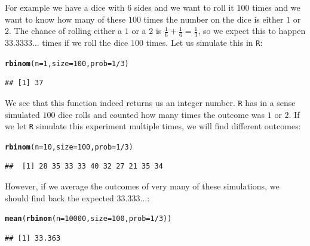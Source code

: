 \documentclass{article}\usepackage[]{graphicx}\usepackage[]{color}
\makeatletter
\newcommand{\hlnum}[1]{\textcolor[rgb]{0.686,0.059,0.569}{#1}}%
\newcommand{\hlopt}[1]{\textcolor[rgb]{0,0,0}{#1}}%
\newcommand{\hlstd}[1]{\textcolor[rgb]{0.345,0.345,0.345}{#1}}%
\newcommand{\hlkwc}[1]{\textcolor[rgb]{0.333,0.667,0.333}{#1}}%
\newcommand{\hlkwd}[1]{\textcolor[rgb]{0.737,0.353,0.396}{\textbf{#1}}}%
\newenvironment{kframe}{%
 \def\at@end@of@kframe{}%
 \ifinner\ifhmode%
  \def\at@end@of@kframe{\end{minipage}}%
  \begin{minipage}{\columnwidth}%
 \fi\fi%
 \def\FrameCommand##1{\hskip\@totalleftmargin \hskip-\fboxsep
 \colorbox{shadecolor}{##1}\hskip-\fboxsep
     \hskip-\linewidth \hskip-\@totalleftmargin \hskip\columnwidth}%
 \MakeFramed {\advance\hsize-\width
   \@totalleftmargin\z@ \linewidth\hsize
   \@setminipage}}%
 {\par\unskip\endMakeFramed%
 \at@end@of@kframe}
\newenvironment{knitrout}{}{} %
\makeatother
\begin{document}
For example we have a dice with 6 sides and we want to roll it $100$ times and we want to know how many of these $100$ times the number on the dice is either $1$ or $2$. The chance of rolling either a $1$ or a $2$ is $\frac{1}{6}+\frac{1}{6}=\frac{1}{3}$, so we expect this to happen $33.3333\dots$ times if we roll the dice $100$ times. Let us simulate this in \texttt{R}:
\begin{knitrout}
\color{fgcolor}\begin{kframe}
\begin{alltt}
\hlkwd{rbinom}\hlstd{(}\hlkwc{n}\hlstd{=}\hlnum{1}\hlstd{,}\hlkwc{size}\hlstd{=}\hlnum{100}\hlstd{,}\hlkwc{prob}\hlstd{=}\hlnum{1}\hlopt{/}\hlnum{3}\hlstd{)}
\end{alltt}
\begin{verbatim}
## [1] 37
\end{verbatim}
\end{kframe}
\end{knitrout}
We see that this function indeed returns us an integer number. \texttt{R} has in a sense simulated $100$ dice rolls and counted how many times the outcome was $1$ or $2$. If we let \texttt{R} simulate this experiment multiple times, we will find different outcomes:
\begin{knitrout}
\color{fgcolor}\begin{kframe}
\begin{alltt}
\hlkwd{rbinom}\hlstd{(}\hlkwc{n}\hlstd{=}\hlnum{10}\hlstd{,}\hlkwc{size}\hlstd{=}\hlnum{100}\hlstd{,}\hlkwc{prob}\hlstd{=}\hlnum{1}\hlopt{/}\hlnum{3}\hlstd{)}
\end{alltt}
\begin{verbatim}
##  [1] 28 35 33 33 40 32 27 21 35 34
\end{verbatim}
\end{kframe}
\end{knitrout}
However, if we average the outcomes of very many of these simulations, we should find back the expected $33.333\dots$:
\begin{knitrout}
\color{fgcolor}\begin{kframe}
\begin{alltt}
\hlkwd{mean}\hlstd{(}\hlkwd{rbinom}\hlstd{(}\hlkwc{n}\hlstd{=}\hlnum{10000}\hlstd{,}\hlkwc{size}\hlstd{=}\hlnum{100}\hlstd{,}\hlkwc{prob}\hlstd{=}\hlnum{1}\hlopt{/}\hlnum{3}\hlstd{))}
\end{alltt}
\begin{verbatim}
## [1] 33.363
\end{verbatim}
\end{kframe}
\end{knitrout}
\end{document}
